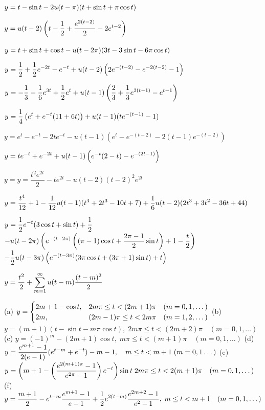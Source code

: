  $y=\displaystyle{t-\sin t-2u(t-\pi)(t+\sin t+\pi\cos t)}$

$y=\displaystyle{u(t-2)\left(t-\frac{1}{2}+\frac{e^{2(t-2)}}{2}
-2e^{t-2}\right)}$

$y=\displaystyle{t+\sin t+\cos t-u(t-2\pi)(3t-3\sin t-6\pi\cos t)}$

$y=\displaystyle{\frac{1}{2}+\frac{1}{2}e^{-2t}-e^{-t}+u(t-2)\left(2
e^{-(t-2)}-e^{-2(t-2)}-1\right)}$

$y=\displaystyle{-\frac{1}{3}-\frac{1}{6}e^{3t}
+\frac{1}{2}e^t+u(t-1)\left(\frac{2}{3}+\frac{1}{3}e^{3(t-1)}
-e^{t-1}\right)}$

$y=\displaystyle{\frac{1}{4}\left(e^t+e^{-t}(11+6t)\right)
+u(t-1)(te^{-(t-1)}-1)}$


$y=e^t-e^{-t}-2te^{-t}-u(t-1)\left(e^t-e^{-(t-2)}-2(t-1)e^{-(t-2)}\right)$

$y=\displaystyle{te^{-t}+e^{-2t}+u(t-1)\left(e^{-t}(2-t)-e^{-(2t-1)}\right)}$

$y=y=\dfrac{t^2e^{2t}}{2}-te^{2t}-u(t-2)(t-2)^2e^{2t}$

$y=\displaystyle{\frac{t^4}{12}+1-\frac{1}{12}u(t-1)(t^4+2t^3-10t+7)+
\frac{1}{6}u(t-2)(2t^3+3t^2-36t+44)}$

$y=\displaystyle{\frac{1}{2}e^{-t}(3\cos t+\sin t)+\frac{1}{2}}$
$\displaystyle{-u(t-2\pi)\left(
e^{-(t-2\pi)}\left((\pi-1)\cos t+\frac{2\pi-1}{2}\sin t\right)+
1-\frac{t}{2}\right)}$
$\displaystyle{-\frac{1}{2}u(t-3\pi)\left(e^{-(t-3\pi)}(3\pi\cos
t+(3\pi+1)\sin t
)+t\right)}$

$y=\displaystyle{\frac{t^2}{2}+\sum_{m=1}^\infty u(t-m)\frac{(t-m)^2}{2}}$

(a) $y=\displaystyle{\begin{cases}
2m+1-\cos t,&2m\pi\le t<(2m+1)\pi\quad(m=0,1,\dots)\\
2m,&(2m-1)\pi\le t<2m\pi\quad(m=1,2,\dots)
\end{cases}}$
(b)
$y=(m+1)(t-\sin t-m\pi\cos t),\;  2m\pi\le t<(2m+2)\pi\quad
(m=0,1,\dots)$
(c)
$y=(-1)^m-(2m+1)\cos t,\;  m\pi\le t<(m+1)\pi\quad(m=0,1,\dots)$
(d)
$y=\displaystyle{\frac{e^{m+1}-1}{2(e-1)}(e^{t-m}+e^{-t})-m-1,\quad m\le t<m+1
\;  (m=0,1\dots)}$
(e)
$y=\displaystyle{\left(m+1-\left(\frac{e^{2(m+1)\pi}-1}{e^{2\pi}-1}\right)e^{-t}\right)\sin
t\;  2m\pi\le t<2(m+1)\pi\quad (m=0,1,\dots)}$
(f)
$y=\displaystyle{\frac{m+1}{2}-e^{t-m}\frac{e^{m+1}-1}{e-1}+\frac{1}{2}e^{2(t-m)}\frac{e^{2m+2}-1}{e^2-1},
\;  m\le t<m+1\quad(m=0,1,\dots)}$



